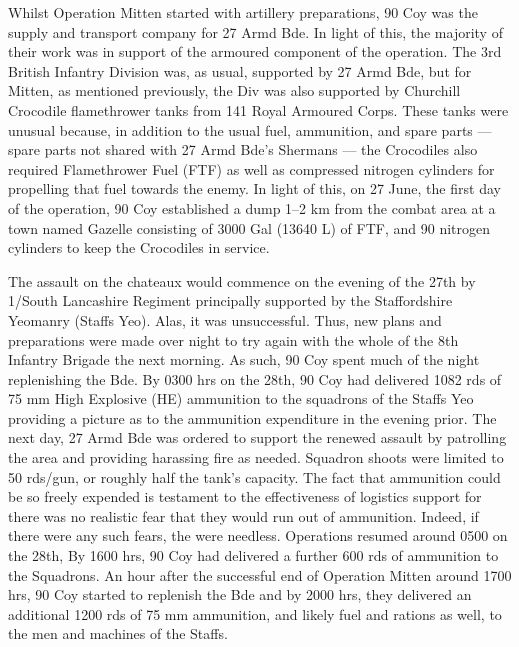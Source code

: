 \documentclass[noraggedright]{turabian-researchpaper}
\begin{document}
Whilst Operation Mitten started with artillery preparations, 90 Coy was the 
supply and transport company for 27 Armd Bde.  In light of this, the majority 
of their work was in support of the armoured component of the operation.  The 
3rd British Infantry Division was, as usual, supported by 27 Armd Bde, but 
for Mitten, as mentioned previously, the Div was also supported by Churchill 
Crocodile flamethrower tanks from 141 Royal Armoured Corps.  These tanks were 
unusual because, in addition to the usual fuel, ammunition, and spare parts 
--- spare parts not shared with 27 Armd Bde's Shermans --- the Crocodiles 
also required Flamethrower Fuel (FTF) as well as compressed nitrogen 
cylinders for propelling that fuel towards the enemy.  In light of this, on 
27 June, the first day of the operation, 90 Coy established a dump 1--2 km 
from the combat area at a town named Gazelle consisting of 3000 Gal (13640 L) 
of FTF, and 90 nitrogen cylinders to keep the Crocodiles in service.\autocite
[27 June 1944]{90wd}

The assault on the chateaux would commence on the evening of the 27th by 
1/South Lancashire Regiment principally supported by the Staffordshire 
Yeomanry (Staffs Yeo). %
Alas, it was unsuccessful.  Thus, new plans and preparations were made over 
night to try again with the whole of the 8th Infantry Brigade the next 
morning.\autocite[111-2]{assault-div}
As such, 90 Coy spent much of the night replenishing the Bde.  By 0300 hrs on 
the 28th, 90 Coy had delivered 1082 rds of 75 mm High Explosive (HE) 
ammunition to the squadrons of the Staffs Yeo providing a picture as to the 
ammunition expenditure in the evening prior.\autocite[28 June 1944]{90wd}
The next day, 27 Armd Bde was ordered to support the renewed assault by 
patrolling the area and providing harassing fire as needed.  Squadron shoots 
were limited to 50 rds/gun, or roughly half the tank's capacity.\autocite
[Operation Instruction No 2 (see June appendix)]{27wd}  
The fact that ammunition could be so freely expended is testament to the 
effectiveness of logistics support for there was no realistic fear that they 
would run out of ammunition.  Indeed, if there were any such fears, the were 
needless.  Operations resumed around 0500 on the 28th, By 1600 hrs, 90 Coy 
had delivered a further 600 rds of ammunition to the Squadrons. An hour 
after the successful end of Operation Mitten around 1700 hrs, 90 Coy started
to replenish the Bde and by 2000 hrs, they delivered an additional 1200 
rds of 75 mm ammunition, and likely fuel and rations as well, to the men and 
machines of the Staffs.\autocite[28 June 1944]{90wd}
\end{document}
